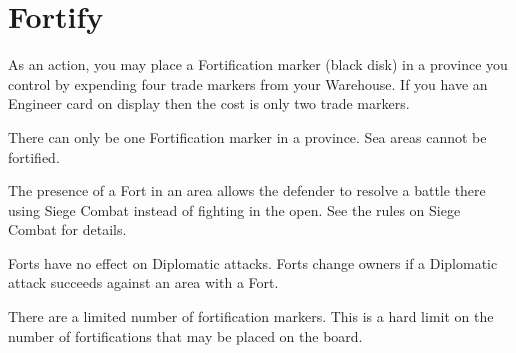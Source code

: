 \section{Fortify}

As an action, you may place a Fortification marker (black disk) in a province you control by expending four trade markers from your Warehouse. If you have an Engineer card on display then the cost is only two trade markers.

There can only be one Fortification marker in a province. Sea areas cannot be fortified.

The presence of a Fort in an area allows the defender to resolve a battle there using Siege Combat instead of fighting in the open. See the rules on Siege Combat for details.

Forts have no effect on Diplomatic attacks. Forts change owners if a Diplomatic attack succeeds against an area with a Fort.

There are a limited number of fortification markers. This is a hard limit on the number of fortifications that may be placed on the board.